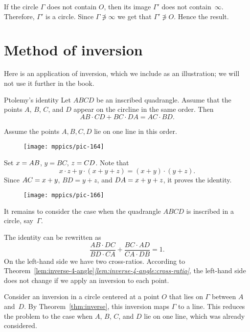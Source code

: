 If the circle $\Gamma$ does not contain $O$, 
then its image $\Gamma'$ does not contain~$\infty$.
Therefore, $\Gamma'$ is a circle.
Since  $\Gamma\not\ni\infty$ we get that $\Gamma' \not\ni O$.
Hence the result.
\qeds

\section*{Method of inversion}

Here is an application of inversion,
which we include as an illustration;
we will not use it further in the book.

\begin{thm}{Ptolemy's identity}\label{ptolemy-id}
Let $ABCD$ be an inscribed quadrangle.
Assume that the points $A$, $B$, $C$, and $D$ appear on the circline in the same order.
Then 
$$ AB\cdot CD+ BC\cdot DA=AC\cdot BD.$$

\end{thm}

Assume the points $A,B,C,D$ lie on one line in this order.

\begin{wrapfigure}{o}{39mm}
\centering
\texttt{[image: mppics/pic-164]}
\end{wrapfigure}

Set $x\z=AB$, $y=BC$, $z\z=CD$.
Note that
$$x\cdot z+y\cdot (x+y+z)=(x+y)\cdot(y+z).$$
Since $AC\z=x+y$, $BD=y+z$, and $DA\z=x+y+z$,
it proves the identity.

\begin{wrapfigure}{o}{39mm}
\centering
\texttt{[image: mppics/pic-166]}
\end{wrapfigure}

It remains to consider the case when the quadrangle $ABCD$ is inscribed in a circle, say~$\Gamma$. 

The identity can be rewritten as 
$$\frac{AB\cdot DC}{ BD\cdot CA}+ \frac{BC\cdot AD}{CA\cdot DB}=1.$$
On the left-hand side we have two cross-ratios.
According to Theorem~\ref{lem:inverse-4-angle}\textit{\ref{lem:inverse-4-angle:cross-ratio}}, the left-hand side does not change if we apply an inversion to each point.

Consider an inversion in a circle centered at a point $O$ that lies on $\Gamma$ between $A$ and~$D$.
By 
Theorem~\ref{thm:inverse},
this inversion maps $\Gamma$ to a line.
This reduces the problem to the case when $A$, $B$, $C$, and $D$ lie on one line, which was already considered.
\qeds

